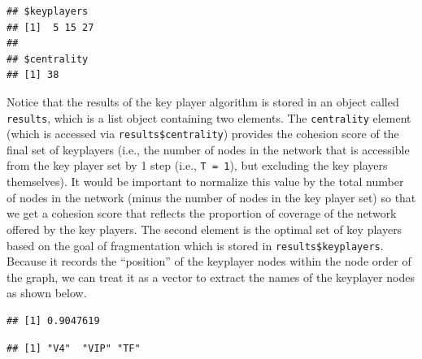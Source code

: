 \documentclass[
]{book}
\newenvironment{Shaded}{\begin{snugshade}}{\end{snugshade}}
\newcommand{\CommentTok}[1]{\textcolor[rgb]{0.56,0.35,0.01}{\textit{#1}}}
\newcommand{\FunctionTok}[1]{\textcolor[rgb]{0.13,0.29,0.53}{\textbf{#1}}}
\newcommand{\NormalTok}[1]{#1}
\newcommand{\SpecialCharTok}[1]{\textcolor[rgb]{0.81,0.36,0.00}{\textbf{#1}}}
\begin{document}
\begin{verbatim}
## $keyplayers
## [1]  5 15 27
## 
## $centrality
## [1] 38
\end{verbatim}

Notice that the results of the key player algorithm is stored in an object called \texttt{results}, which is a list object containing two elements. The \texttt{centrality} element (which is accessed via \texttt{results\$centrality}) provides the cohesion score of the final set of keyplayers (i.e., the number of nodes in the network that is accessible from the key player set by 1 step (i.e., \texttt{T\ =\ 1}), but excluding the key players themselves). It would be important to normalize this value by the total number of nodes in the network (minus the number of nodes in the key player set) so that we get a cohesion score that reflects the proportion of coverage of the network offered by the key players. The second element is the optimal set of key players based on the goal of fragmentation which is stored in \texttt{results\$keyplayers}. Because it records the ``position'' of the keyplayer nodes within the node order of the graph, we can treat it as a vector to extract the names of the keyplayer nodes as shown below.

\begin{Shaded}
\end{Shaded}

\begin{verbatim}
## [1] 0.9047619
\end{verbatim}

\begin{Shaded}
\end{Shaded}

\begin{verbatim}
## [1] "V4"  "VIP" "TF"
\end{verbatim}
\end{document}
